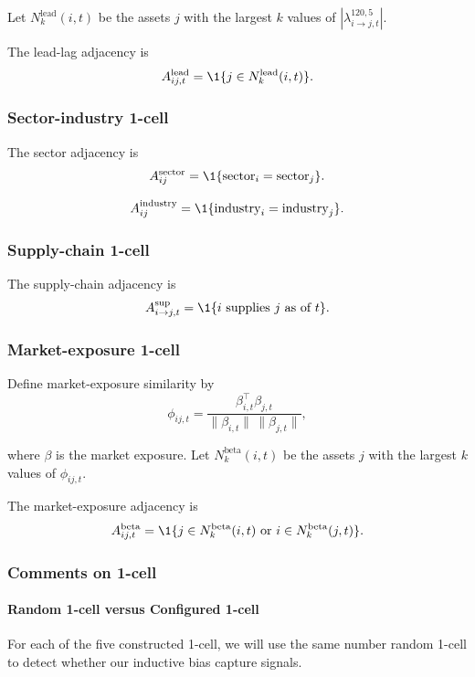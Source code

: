 \documentclass[11pt]{article}
\begin{document}
Let $N_k^{\mathrm{lead}}(i,t)$ be the assets $j$ with the largest $k$ values of $|\lambda_{i\to j,t}^{120,5}|$. 

The lead-lag adjacency is
\[
    A_{ij,t}^{\mathrm{lead}}
    =
    \1\{j \in N_k^{\mathrm{lead}}(i,t)\}.
\]
\subsubsection{Sector-industry 1-cell}
The sector adjacency is
\[
    A_{ij}^{\mathrm{sector}}
    =
    \1\{\text{sector}_i = \text{sector}_j\}.
\]

\[
    A_{ij}^{\mathrm{industry}}
    =
    \1\{\text{industry}_i = \text{industry}_j\}.
\]

\subsubsection{Supply-chain 1-cell}

The supply-chain adjacency is
\[
    A_{i\to j,t}^{\mathrm{sup}}
    =
    \1\{i \text{ supplies } j \text{ as of } t\}.
\]

\subsubsection{Market-exposure 1-cell}

Define market-exposure similarity by
\[
    \phi_{ij,t}
    =
    \frac{\beta_{i,t}^{\top}\beta_{j,t}}{\|\beta_{i,t}\|\,\|\beta_{j,t}\|},
\]

where $\beta$ is the market exposure. Let $N_k^{\mathrm{beta}}(i,t)$ be the assets $j$ with the largest $k$ values of $\phi_{ij,t}$. 

The market-exposure adjacency is
\[
    A_{ij,t}^{\mathrm{beta}}
    =
    \1\{j \in N_k^{\mathrm{beta}}(i,t) \text{ or } i \in N_k^{\mathrm{beta}}(j,t)\}.
\]



\subsubsection{Comments on 1-cell}

\paragraph{Random 1-cell versus Configured 1-cell}

For each of the five constructed 1-cell, we will use the same number random 1-cell to detect whether our inductive bias capture signals.
\end{document}
